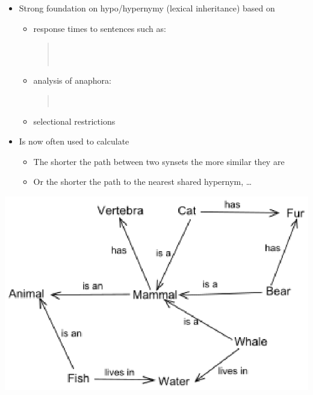 \documentclass[headrule,footrule]{foils}
\begin{document}
\begin{itemize}
\item Strong foundation on hypo/hypernymy (lexical inheritance) based on
  \begin{itemize}
  \item   response times to sentences such as:
    \begin{quote}%
      \\
      \\
    \end{quote}
  \item analysis of anaphora:
    \begin{quote}%
      \\
    \end{quote}
  \item selectional restrictions
  \end{itemize}
\item Is now often used to calculate 
  \begin{itemize}
  \item The shorter the path between two synsets the more similar they are
  \item Or the shorter the path to the nearest shared hypernym, \ldots
  \end{itemize}
\end{itemize}


\MyLogo{}
\includegraphics[height=0.75\textheight]{pics/Semantic_Net.eps}
\end{document}
